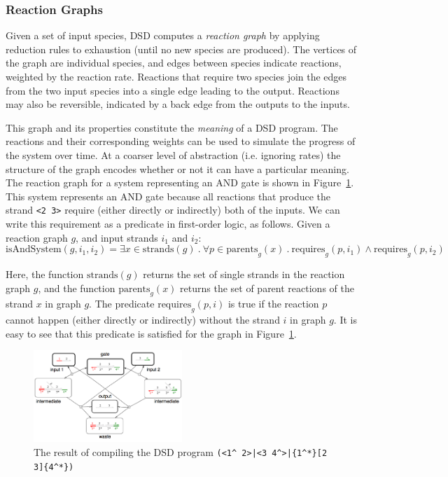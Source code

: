 \documentclass{article}[10pt]
\begin{document}
\subsubsection{Reaction Graphs}

Given a set of input species, DSD computes a \emph{reaction graph} by applying
reduction rules to exhaustion (until no new species are produced). The vertices
of the graph are individual species, and edges between species indicate
reactions, weighted by the reaction rate. Reactions that require two species
join the edges from the two input species into a single edge leading to the
output. Reactions may also be reversible, indicated by a back edge from the
outputs to the inputs.

This graph
and its properties constitute the \emph{meaning} of a DSD program.
The reactions and their corresponding weights can be used to simulate
the progress of the system over time. At a coarser level of abstraction
(i.e. ignoring rates) the structure of the graph encodes whether or not
it can have a particular meaning. The reaction
graph for a system representing an AND gate is shown in
Figure~\ref{figure:and-gate}. This system represents an AND gate
because all reactions that produce the strand \verb;<2 3>;
require (either directly or indirectly) both of the inputs.
We can write this requirement as a predicate in first-order logic, as
follows. Given a reaction graph $g$, and input strands $i_1$ and $i_2$:
\begin{equation}
\mathrm{isAndSystem}(g, i_1, i_2) =
\exists x \in \mathrm{strands}(g)\ .\ 
\forall p \in \mathrm{parents}_g(x)\ .\ 
\mathrm{requires}_g(p, i_1) \land \mathrm{requires}_g(p, i_2)
\label{eq:and-sys}
\end{equation}

Here, the function $\mathrm{strands}(g)$ returns the set of single strands in
the reaction graph $g$, and the function $\mathrm{parents}_g(x)$ returns
the set of parent reactions of the strand $x$ in graph $g$. The predicate 
$\mathrm{requires}_g(p,i)$ is true if the reaction $p$ cannot happen
(either directly or indirectly) without the strand $i$ in graph $g$.
It is easy to see that this predicate is satisfied for the graph in
Figure~\ref{figure:and-gate}.

\begin{figure}
\centering
\includegraphics[width=0.5\textwidth]{figures/and-gate.png}
\caption{
The result of compiling the DSD program
\texttt{(<1\^{} 2>|<3 4\^{}>|\{1\^{}*\}[2 3]\{4\^{}*\})}
}
\label{figure:and-gate}
\end{figure}
\end{document}
